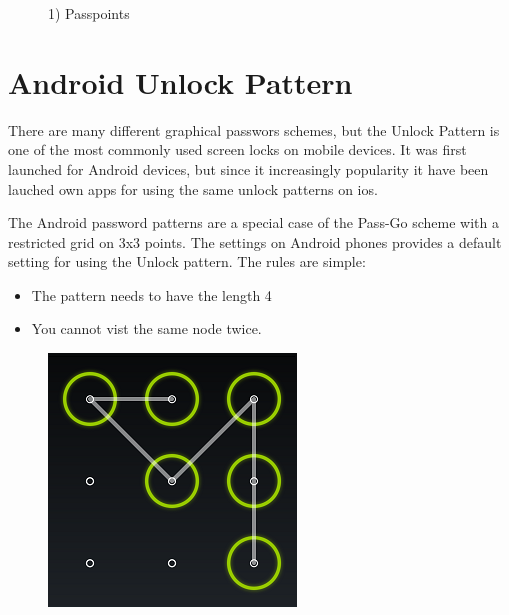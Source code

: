       \begin{figure}[H]
        \centering
        \caption{1) Passpoints}
      \end{figure}

  \clearpage
  \section{Android Unlock Pattern}


    There are many different graphical passwors schemes, but the Unlock Pattern is one of the most commonly used screen 
    locks on mobile devices. It was first launched for Android devices, but since it increasingly popularity it have been 
    lauched own apps for using the same unlock patterns on ios.

    The Android password patterns are a special case of the Pass-Go scheme with a restricted grid on 3x3 points. The settings
    on Android phones provides a default setting for using the Unlock pattern. 
    The rules are simple: 
        \begin{itemize}
            \item The pattern needs to have the length 4
            \item You cannot vist the same node twice.
        \end{itemize}

    \begin{figure}[H]
        \centering
        \includegraphics[scale=0.8]{pics/patternLock.png}
    \end{figure}

